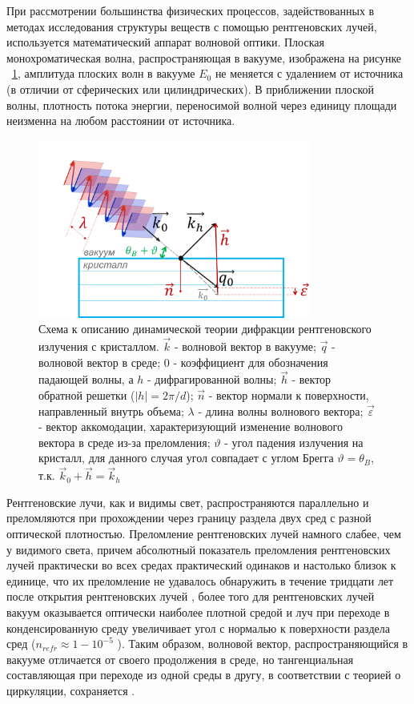   При рассмотрении большинства физических процессов, задействованных
  в методах исследования структуры веществ с помощью рентгеновских лучей,
  используется математический аппарат волновой оптики.
  Плоская монохроматическая волна, распространяющая в вакууме, изображена на рисунке ~\ref{ris:plane_wave_vacuum},
  амплитуда плоских волн в вакууме $E_0$ не меняется с удалением от
  источника (в отличии от сферических или цилиндрических). В приближении плоской волны,
  плотность потока энергии, переносимой волной через единицу площади неизменна на любом расстоянии от источника.

  \begin{figure}[H]
    \centering
    \includegraphics[width=0.8\textwidth]{images/plane_wave_vacuum.png}
    \caption{Схема к описанию динамической теории дифракции рентгеновского излучения с кристаллом.
      $\vec {k}$ - волновой вектор в вакууме; $\vec {q}$ - волновой вектор в среде;
     $0$ - коэффициент для обозначения падающей волны, а $h$ -  дифрагированной волны; $\vec{h}$ - вектор
     обратной решетки ($|h|=2\pi/d$); $\vec{n}$ - вектор нормали к поверхности, направленный внутрь объема;
     $\lambda$ - длина волны волнового вектора; $\vec{\varepsilon}$ - вектор аккомодации, характеризующий изменение
     волнового вектора в среде из-за преломления; $\vartheta$ - угол падения излучения на кристалл, для данного
     случая угол совпадает с углом Брегга $\vartheta = \theta_B$, т.к.  $\vec {k}_0 + \vec{h} = \vec {k}_h $}
    \label{ris:plane_wave_vacuum}
  \end{figure}

Рентгеновские лучи, как и видимы свет, распространяются параллельно и преломляются при
прохождении через границу раздела двух сред с разной оптической плотностью.
 Преломление рентгеновских лучей намного слабее, чем у видимого света, причем
 абсолютный показатель преломления рентгеновских лучей практически во всех средах
 практический одинаков и настолько близок к единице, что их преломление не удавалось обнаружить
 в течение тридцати лет после открытия рентгеновских лучей \cite{fetisov2007}, более того
 для рентгеновских лучей вакуум оказывается оптически наиболее плотной средой и луч
 при переходе в конденсированную среду увеличивает угол с нормалью к поверхности раздела сред ($n_{refr} \approx 1-10^{-5}$ ).
 Таким образом, волновой вектор, распространяющийся в вакууме отличается от своего продолжения в
 среде, но тангенциальная составляющая при переходе из одной среды в другу, в соответствии с теорией о циркуляции, сохраняется \cite{landau_8_1992}.

